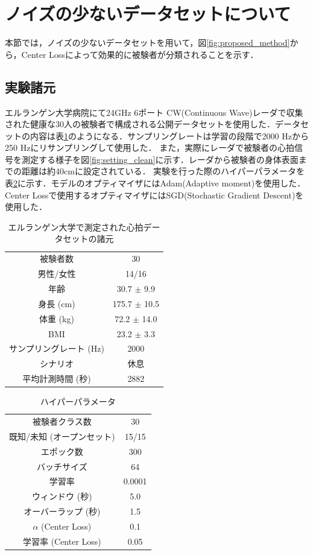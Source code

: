 \section{ノイズの少ないデータセットについて}
本節では，ノイズの少ないデータセットを用いて，図\ref{fig:proposed_method}から，Center Lossによって効果的に被験者が分類されることを示す．
\subsection{実験諸元}
エルランゲン大学病院にて24GHz 6ポート CW(Continuous Wave)レーダで収集された健康な30人の被験者で構成される公開データセットを使用した\cite{paper:30-dataset}．データセットの内容は表\ref{table:30-dataset}のようになる．サンプリングレートは学習の段階で2000 Hzから250 Hzにリサンプリングして使用した．
また，実際にレーダで被験者の心拍信号を測定する様子を図\ref{fig:setting_clean}に示す．レーダから被験者の身体表面までの距離は約40cmに設定されている．
実験を行った際のハイパーパラメータを表\ref{table:30-parameter}に示す．モデルのオプティマイザにはAdam(Adaptive moment)を使用した．Center Lossで使用するオプティマイザにはSGD(Stochastic Gradient Descent)を使用した．

\begin{table}[H]
\caption{エルランゲン大学で測定された心拍データセットの諸元}
\centering
\begin{tabular}{cc}
\hline
被験者数 & 30 \\
男性/女性 & 14/16 \\
年齢 & 30.7 $\pm$ 9.9 \\
身長 (cm) & 175.7 $\pm$ 10.5 \\
体重 (kg) & 72.2 $\pm$ 14.0 \\
BMI & 23.2 $\pm$ 3.3 \\
サンプリングレート (Hz) & 2000 \\
シナリオ & 休息 \\
平均計測時間 (秒) & 2882 \\
\hline
\end{tabular}
\label{table:30-dataset}
\end{table}

\begin{table}[H]
\caption{ハイパーパラメータ}
\centering
\begin{tabular}{cc}
\hline
被験者クラス数 & 30 \\
既知/未知 (オープンセット) & 15/15 \\
エポック数 & 300 \\
バッチサイズ & 64 \\
学習率 & 0.0001 \\
ウィンドウ (秒) & 5.0 \\
オーバーラップ (秒) & 1.5 \\
$\alpha$ (Center Loss) & 0.1 \\
学習率 (Center Loss) & 0.05 \\
\hline
\end{tabular}
\label{table:30-parameter}
\end{table}

